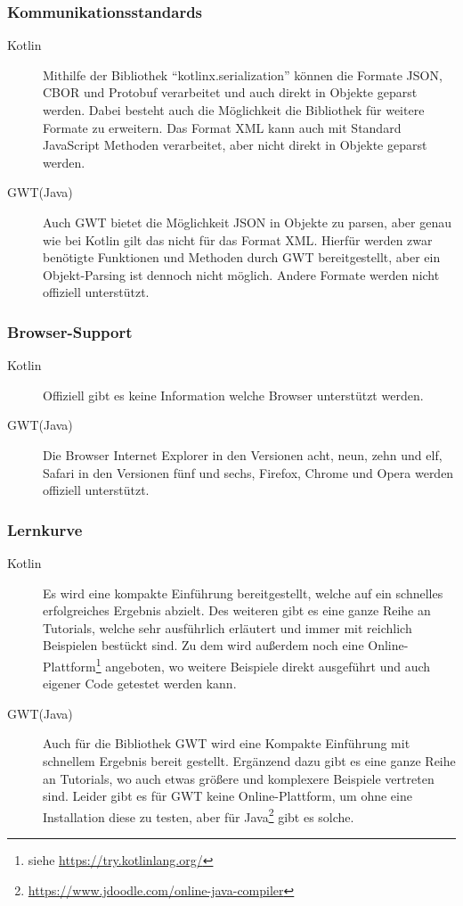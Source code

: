 \subsubsection{Kommunikationsstandards}
\begin{description}
	\item[Kotlin] Mithilfe der Bibliothek \enquote{kotlinx.serialization} können die Formate \gls{JSON}, \gls{CBOR} und Protobuf verarbeitet und auch direkt in Objekte geparst werden. Dabei besteht auch die Möglichkeit die Bibliothek für weitere Formate zu erweitern. Das Format \gls{XML} kann auch mit Standard JavaScript Methoden verarbeitet, aber nicht direkt in Objekte geparst werden. \cite{kotlinxSerialization}
	\item[GWT(Java)] Auch \gls{GWT} bietet die Möglichkeit \gls{JSON} in Objekte zu parsen, aber genau wie bei Kotlin gilt das nicht für das Format \gls{XML}. Hierfür werden zwar benötigte Funktionen und Methoden durch \gls{GWT} bereitgestellt, aber ein Objekt-Parsing ist dennoch nicht möglich. Andere Formate werden nicht offiziell unterstützt. \cite{gwtJSON, gwtXML}
\end{description}

\subsubsection{Browser-Support}
\begin{description}
	\item[Kotlin] Offiziell gibt es keine Information welche Browser unterstützt werden.
	\item[GWT(Java)] Die Browser Internet Explorer in den Versionen acht, neun, zehn und elf, Safari in den Versionen fünf und sechs, Firefox, Chrome und Opera werden offiziell unterstützt. \cite{gwtGettingStarted}
\end{description}

\subsubsection{Lernkurve}
\begin{description}
	\item[Kotlin] Es wird eine kompakte Einführung bereitgestellt, welche auf ein schnelles erfolgreiches Ergebnis abzielt. Des weiteren gibt es eine ganze Reihe an Tutorials, welche sehr ausführlich erläutert und immer mit reichlich Beispielen bestückt sind. Zu dem wird außerdem noch eine Online-Plattform\footnote{siehe \url{https://try.kotlinlang.org/}} angeboten, wo weitere Beispiele direkt ausgeführt und auch eigener Code getestet werden kann. \cite{kotlinReference}
	\item[GWT(Java)] Auch für die Bibliothek \gls{GWT} wird eine Kompakte Einführung mit schnellem Ergebnis bereit gestellt. Ergänzend dazu gibt es eine ganze Reihe an Tutorials, wo auch etwas größere und komplexere Beispiele vertreten sind. Leider gibt es für \gls{GWT} keine Online-Plattform, um ohne eine Installation diese zu testen, aber für Java\footnote{\url{https://www.jdoodle.com/online-java-compiler}} gibt es solche. \cite{gwtGettingStarted}
\end{description}


